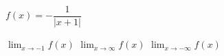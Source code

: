 \noindent\begin{minipage}[t]{0.58\linewidth}\vspace{0pt}\raggedright $f(x)=-\dfrac{1}{|x+1|}$\end{minipage}\hfill\begin{minipage}[t]{0.4\linewidth}\vspace{0pt}\centering \resizebox{\ifdim\width>\linewidth\linewidth\else\width\fi}{!}{}\end{minipage}\par
{} $\displaystyle\lim_{x\to -1} f(x)$
 $\displaystyle\lim_{x\to\infty} f(x)$
 $\displaystyle\lim_{x\to-\infty} f(x)$
